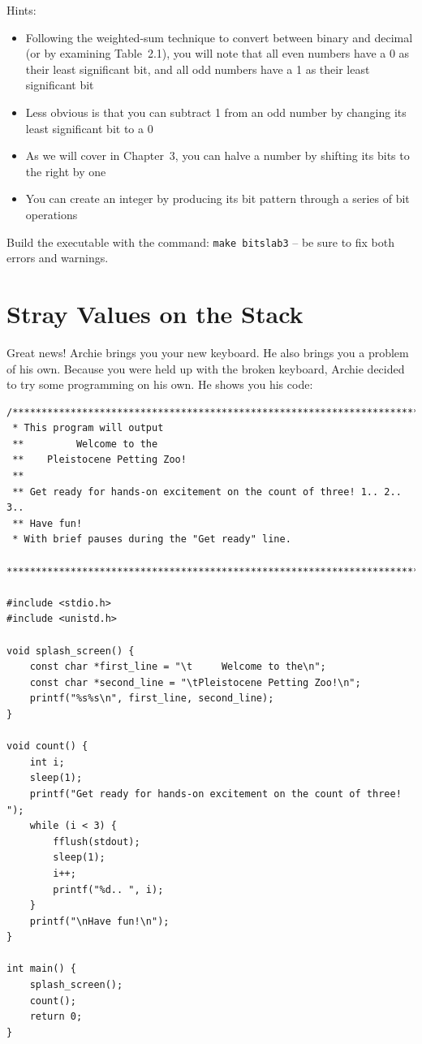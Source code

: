 Hints:
\begin{itemize}
\item Following the weighted-sum technique to convert between binary and
    decimal (or by examining Table~2.1), you will note that all even numbers
    have a 0 as their least significant bit, and all odd numbers have a 1 as
    their least significant bit
\item Less obvious is that you can subtract 1 from an odd number by changing
    its least significant bit to a 0
\item As we will cover in Chapter~3, you can halve a number by shifting its
    bits to the right by one
\item You can create an integer by producing its bit pattern through a series
    of bit operations
\end{itemize}

Build the executable with the command: \texttt{make bitslab3} -- be sure to fix
both errors and warnings.


\section{Stray Values on the Stack}

Great news! Archie brings you your new keyboard. He also brings you a problem
of his own. Because you were held up with the broken keyboard, Archie decided
to try some programming on his own. He shows you his code:

\begin{lstlisting}
/***********************************************************************
 * This program will output
 **         Welcome to the
 **    Pleistocene Petting Zoo!
 **
 ** Get ready for hands-on excitement on the count of three! 1.. 2.. 3..
 ** Have fun!
 * With brief pauses during the "Get ready" line.
 ***********************************************************************/

#include <stdio.h>
#include <unistd.h>

void splash_screen() {
    const char *first_line = "\t     Welcome to the\n";
    const char *second_line = "\tPleistocene Petting Zoo!\n";
    printf("%s%s\n", first_line, second_line);
}

void count() {
    int i;
    sleep(1);
    printf("Get ready for hands-on excitement on the count of three! ");
    while (i < 3) {
        fflush(stdout);
        sleep(1);
        i++;
        printf("%d.. ", i);
    }
    printf("\nHave fun!\n");
}

int main() {
    splash_screen();
    count();
    return 0;
}
\end{lstlisting}

